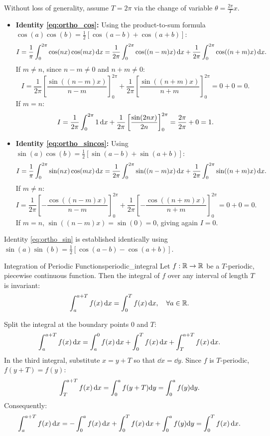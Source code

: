 \begin{demonstration}
Without loss of generality, assume $T = 2\pi$ via the change of variable $\theta = \frac{2\pi}{T} x$.
\begin{itemize}
    \item \textbf{Identity \eqref{eq:ortho_cos}:} Using the product-to-sum formula $\cos(a)\cos(b) = \frac{1}{2}[\cos(a-b) + \cos(a+b)]$:
    \[
    I = \frac{1}{\pi} \int_0^{2\pi} \cos(nx)\cos(mx) \,\mathrm{d}x = \frac{1}{2\pi} \int_0^{2\pi} \cos((n-m)x) \,\mathrm{d}x + \frac{1}{2\pi} \int_0^{2\pi} \cos((n+m)x) \,\mathrm{d}x.
    \]
    If $m \neq n$, since $n-m \neq 0$ and $n+m \neq 0$:
    \[
    I = \frac{1}{2\pi} \left[ \frac{\sin((n-m)x)}{n-m} \right]_0^{2\pi} + \frac{1}{2\pi} \left[ \frac{\sin((n+m)x)}{n+m} \right]_0^{2\pi} = 0 + 0 = 0.
    \]
    If $m = n$:
    \[
    I = \frac{1}{2\pi} \int_0^{2\pi} 1 \,\mathrm{d}x + \frac{1}{2\pi} \left[ \frac{\sin(2nx)}{2n} \right]_0^{2\pi} = \frac{2\pi}{2\pi} + 0 = 1.
    \]
    \item \textbf{Identity \eqref{eq:ortho_sincos}:} Using $\sin(a)\cos(b) = \frac{1}{2}[\sin(a-b) + \sin(a+b)]$:
    \[
    I = \frac{1}{\pi} \int_0^{2\pi} \sin(nx)\cos(mx) \,\mathrm{d}x = \frac{1}{2\pi} \int_0^{2\pi} \sin((n-m)x) \,\mathrm{d}x + \frac{1}{2\pi} \int_0^{2\pi} \sin((n+m)x) \,\mathrm{d}x.
    \]
    If $m \neq n$:
    \[
    I = \frac{1}{2\pi} \left[ -\frac{\cos((n-m)x)}{n-m} \right]_0^{2\pi} + \frac{1}{2\pi} \left[ -\frac{\cos((n+m)x)}{n+m} \right]_0^{2\pi} = 0 + 0 = 0.
    \]
    If $m = n$, $\sin((n-m)x) = \sin(0) = 0$, giving again $I = 0$.
\end{itemize}
Identity \eqref{eq:ortho_sin} is established identically using $\sin(a)\sin(b) = \frac{1}{2}[\cos(a-b) - \cos(a+b)]$.
\end{demonstration}

\begin{lemme}{Integration of Periodic Functions}{periodic_integral}
Let $f: \mathbb{R} \to \mathbb{R}$ be a $T$-periodic, piecewise continuous function. Then the integral of $f$ over any interval of length $T$ is invariant:
\[
\int_a^{a+T} f(x) \,\mathrm{d}x = \int_0^T f(x) \,\mathrm{d}x, \quad \forall a \in \mathbb{R}.
\]
\end{lemme}

\begin{demonstration}
Split the integral at the boundary points $0$ and $T$:
\[
\int_a^{a+T} f(x) \,\mathrm{d}x = \int_a^0 f(x) \,\mathrm{d}x + \int_0^T f(x) \,\mathrm{d}x + \int_T^{a+T} f(x) \,\mathrm{d}x.
\]
In the third integral, substitute $x = y + T$ so that $\dd x = \dd y$. Since $f$ is $T$-periodic, $f(y+T) = f(y)$:
\[
\int_T^{a+T} f(x) \,\mathrm{d}x = \int_0^a f(y+T) \mathrm{d} y = \int_0^a f(y) \mathrm{d} y.
\]
Consequently:
\[
\int_a^{a+T} f(x) \,\mathrm{d}x = -\int_0^a f(x) \,\mathrm{d}x + \int_0^T f(x) \,\mathrm{d}x + \int_0^a f(y) \mathrm{d} y = \int_0^T f(x) \,\mathrm{d}x.
\]
\end{demonstration}

